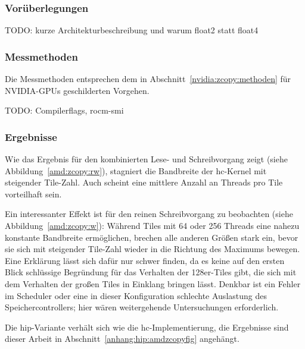 \subsubsection{Vorüberlegungen}

TODO: kurze Architekturbeschreibung und warum float2 statt float4

\subsubsection{Messmethoden}

Die Messmethoden entsprechen dem in Abschnitt~\ref{nvidia:zcopy:methoden}
für NVIDIA-GPUs geschilderten Vorgehen.

TODO: Compilerflags, rocm-smi

\subsubsection{Ergebnisse}

Wie das Ergebnis für den kombinierten Lese- und Schreibvorgang zeigt (siehe
Abbildung~\ref{amd:zcopy:rw}), stagniert die Bandbreite der \gls{hc}-Kernel mit
steigender Tile-Zahl. Auch scheint eine mittlere Anzahl an Threads pro Tile
vorteilhaft sein.

Ein interessanter Effekt ist für den reinen Schreibvorgang zu beobachten (siehe
Abbildung~\ref{amd:zcopy:w}): Während Tiles mit \num{64} oder \num{256} Threads
eine nahezu konstante Bandbreite ermöglichen, brechen alle anderen Größen stark
ein, bevor sie sich mit steigender Tile-Zahl wieder in die Richtung des Maximums
bewegen. Eine Erklärung lässt sich dafür nur schwer finden, da es keine auf den
ersten Blick schlüssige Begründung für das Verhalten der \num{128}er-Tiles gibt,
die sich mit dem Verhalten der großen Tiles in Einklang bringen lässt. Denkbar
ist ein Fehler im Scheduler oder eine in dieser Konfiguration schlechte
Auslastung des Speichercontrollers; hier wären weitergehende Untersuchungen
erforderlich.

Die \gls{hip}-Variante verhält sich wie die \gls{hc}-Implementierung, die
Ergebnisse sind dieser Arbeit in Abschnitt~\ref{anhang:hip:amdzcopyfig}
angehängt.

